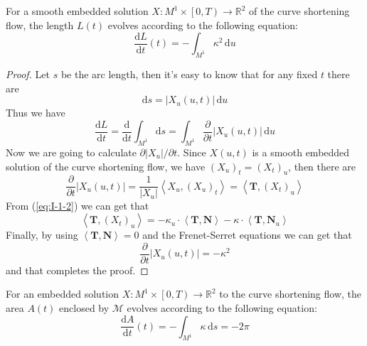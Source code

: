 \begin{lemma}\label{lem:I-1-1}
    For a smooth embedded solution $X:M^1\times\left[0,T\right)\to\mathbb{R}^2$ of the curve shortening flow, the length $L(t)$ evolves according to the following equation:
    \begin{equation}
        \frac{\mathrm{d}L}{\mathrm{d}t}(t)=-\int_{M^1}\kappa^2\,\mathrm{d}u
    \end{equation}
\end{lemma}
\begin{proof}
    Let $s$ be the arc length, then it's easy to know that for any fixed $t$ there are
    \begin{equation}\label{eq:I-1-3}
        \mathrm{d}s=\left|X_u(u,t)\right|\,\mathrm{d}u
    \end{equation}
    Thus we have
    \begin{equation*}
        \frac{\mathrm{d}L}{\mathrm{d}t}=\frac{\mathrm{d}}{\mathrm{d}t}\int_{M^1}\mathrm{d}s=\int_{M^1}\frac{\partial}{\partial t}\left|X_u(u,t)\right|\,\mathrm{d}u
    \end{equation*}
    Now we are going to calculate $\partial\left|X_u\right|/\partial t$. Since $X(u,t)$ is a smooth embedded solution of the curve shortening flow, we have ${\left(X_u\right)}_t={\left(X_t\right)}_u$, then there are
    \begin{equation*}
        \frac{\partial}{\partial t}\left|X_u (u,t)\right|=\frac{1}{\left|X_u\right|}\left<X_u,{\left(X_u\right)}_t\right>=\left<\mathbf{T},{\left(X_t\right)}_u\right>
    \end{equation*}
    From (\ref{eq:I-1-2}) we can get that
    \begin{equation*}
        \left<\mathbf{T},{\left(X_t\right)}_u\right>=-\kappa_u\cdot\left<\mathbf{T},\mathbf{N}\right>-\kappa\cdot\left<\mathbf{T},\mathbf{N}_u\right>
    \end{equation*}
    Finally, by using $\left<\mathbf{T},\mathbf{N}\right>=0$ and the Frenet-Serret equations we can get that
    \begin{equation}\label{eq:I-1-4}
        \frac{\partial}{\partial t}\left|X_u (u,t)\right|=-\kappa^2
    \end{equation}
    and that completes the proof.
\end{proof}

\begin{lemma}\label{lem:I-1-2}
    For an embedded solution $X:M^1\times\left[0,T\right)\to\mathbb{R}^2$ to the curve shortening flow, the area $A(t)$ enclosed by $\mathcal{M}$ evolves according to the following equation:
    \begin{equation}
        \frac{\mathrm{d}A}{\mathrm{d}t}(t)=-\int_{M^1}\kappa\,\mathrm{d}s=-2\pi
    \end{equation}
\end{lemma}

